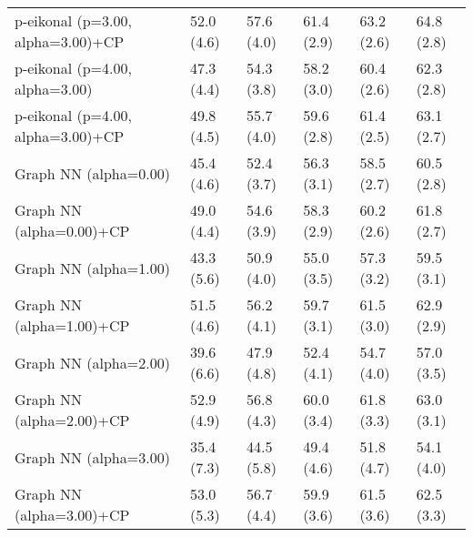 \documentclass{article}
\begin{document}
\begin{table*}[t!]
\begin{center}
\begin{small}
\begin{sc}
\begin{tabular}{llllll}
p-eikonal (p=3.00, alpha=3.00)+CP&52.0 (4.6)      &57.6 (4.0)      &61.4 (2.9)      &63.2 (2.6)      &64.8 (2.8)      \\
p-eikonal (p=4.00, alpha=3.00)&47.3 (4.4)      &54.3 (3.8)      &58.2 (3.0)      &60.4 (2.6)      &62.3 (2.8)      \\
p-eikonal (p=4.00, alpha=3.00)+CP&49.8 (4.5)      &55.7 (4.0)      &59.6 (2.8)      &61.4 (2.5)      &63.1 (2.7)      \\
Graph NN (alpha=0.00)&45.4 (4.6)      &52.4 (3.7)      &56.3 (3.1)      &58.5 (2.7)      &60.5 (2.8)      \\
Graph NN (alpha=0.00)+CP&49.0 (4.4)      &54.6 (3.9)      &58.3 (2.9)      &60.2 (2.6)      &61.8 (2.7)      \\
Graph NN (alpha=1.00)&43.3 (5.6)      &50.9 (4.0)      &55.0 (3.5)      &57.3 (3.2)      &59.5 (3.1)      \\
Graph NN (alpha=1.00)+CP&51.5 (4.6)      &56.2 (4.1)      &59.7 (3.1)      &61.5 (3.0)      &62.9 (2.9)      \\
Graph NN (alpha=2.00)&39.6 (6.6)      &47.9 (4.8)      &52.4 (4.1)      &54.7 (4.0)      &57.0 (3.5)      \\
Graph NN (alpha=2.00)+CP&52.9 (4.9)      &56.8 (4.3)      &60.0 (3.4)      &61.8 (3.3)      &63.0 (3.1)      \\
Graph NN (alpha=3.00)&35.4 (7.3)      &44.5 (5.8)      &49.4 (4.6)      &51.8 (4.7)      &54.1 (4.0)      \\
Graph NN (alpha=3.00)+CP&53.0 (5.3)      &56.7 (4.4)      &59.9 (3.6)      &61.5 (3.6)      &62.5 (3.3)      \\
\bottomrule
\end{tabular}
\end{sc}
\end{small}
\end{center}
\vskip -0.1in
\end{table*}
\end{document}
